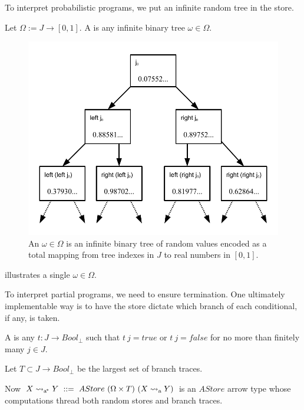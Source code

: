 To interpret probabilistic programs, we put an infinite random tree in the store.

\begin{definition}
Let $\Omega := J \to [0,1]$.
A  is any infinite binary tree $\omega \in \Omega$.
\end{definition}

\begin{figure}[!tb]\centering
\includegraphics[width=5in]{figures/random-tree}
\caption[A random source $\omega \in \Omega$]{An $\omega \in \Omega$ is an infinite binary tree of random values encoded as a total mapping from tree indexes in $J$ to real numbers in $[0,1]$.}
\label{fig:omega-tree}
\end{figure}

 illustrates a single $\omega \in \Omega$.

To interpret partial programs, we need to ensure termination.
One ultimately implementable way is to have the store dictate which branch of each conditional, if any, is taken.

\begin{definition}
A  is any $t : J \to Bool_\bot$ such that $t~j = true$ or $t~j = false$ for no more than finitely many $j \in J$.

Let $T \subset J \to Bool_\bot$ be the largest set of branch traces.
\end{definition}

Now $X \rightsquigarrow_\mathrm{a^{\mspace{-2mu}*}} Y\ ::=\ AStore~(\Omega \times T)~(X \rightsquigarrow_\mathrm{a} Y)$ is an $AStore$ arrow type whose computations thread both random stores and branch traces.


